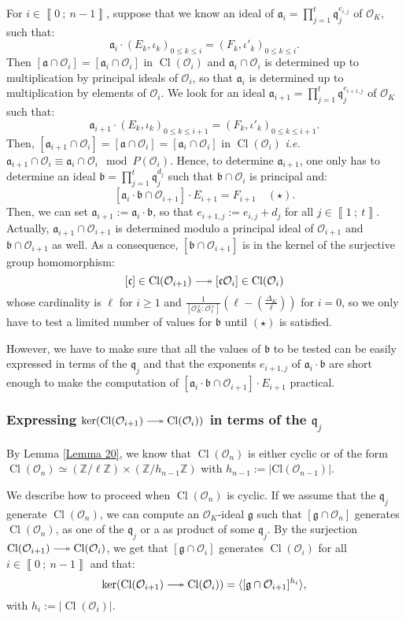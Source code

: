 \documentclass[a4paper,10pt]{report}
\theoremstyle{definition}
\theoremstyle{plain}
\theoremstyle{definition}
\newcommand{\ie}{\emph{i.e.}\ }
\newcommand{\Z}{\mathbb{Z}}
\newcommand{\mO}{\mathcal{O}}
\renewcommand{\i}[2]{\left\llbracket #1~;~#2\right\rrbracket}
\renewcommand{\(}{\left(}
\renewcommand{\)}{\right)}
\newcommand{\mf}[1]{\mathfrak{#1}}
\newcommand{\mfq}{\mathfrak{q}}
\DeclareMathOperator{\Cl}{Cl}
\begin{document}
For $i\in\i{0}{n-1}$, suppose that we know an ideal of $\mf{a}_i=\prod_{j=1}^t \mf{q}_j^{e_{i, j}}$ of $\mO_K$, such that: 
\[\mf{a}_i\cdot(E_k, \iota_k)_{0\leq k\leq i}=(F_k,\iota'_k)_{0\leq k\leq i}.\]
Then $[\mf{a}\cap \mO_i]=[\mf{a}_i\cap\mO_i]$ in $\Cl(\mO_i)$ and $\mf{a}_i\cap \mO_i$ is determined up to multiplication by principal ideals of $\mO_i$, so that $\mf{a}_i$ is determined up to multiplication by elements of $\mO_i$.  We look for an ideal $\mf{a}_{i+1}=\prod_{j=1}^t \mf{q}_j^{e_{i+1, j}}$ of $\mO_K$ such that:
\[\mf{a}_{i+1}\cdot(E_k, \iota_k)_{0\leq k\leq i+1}=(F_k,\iota'_k)_{0\leq k\leq i+1}.\]
Then, $[\mf{a}_{i+1}\cap\mO_{i}]=[\mf{a}\cap \mO_{i}]=[\mf{a}_i\cap\mO_{i}]$ in $\Cl(\mO_{i})$ \ie $\mf{a}_{i+1}\cap\mO_i\equiv \mf{a}_i\cap\mO_i \mod P(\mO_i)$. Hence, to determine $\mf{a}_{i+1}$, one only has to determine an ideal $\mf{b}=\prod_{j=1}^t\mf{q}_j^{d_j}$ such that $\mf{b}\cap\mO_i$ is principal and: 
\[[\mf{a}_i\cdot \mf{b}\cap\mO_{i+1}]\cdot E_{i+1}=F_{i+1} \quad (\star).\]
Then,  we can set $\mf{a}_{i+1}:=\mf{a}_i\cdot \mf{b}$, so that $e_{i+1,j}:=e_{i,j}+d_j$ for all $j\in\i{1}{t}$.  Actually, $\mf{a}_{i+1}\cap\mO_{i+1}$ is determined modulo a principal ideal of $\mO_{i+1}$ and $\mf{b}\cap\mO_{i+1}$ as well. As a consequence,  $[\mf{b}\cap\mO_{i+1}]$ is in the kernel of the surjective group homomorphism:
\[[\mf{c}]\in\Cl(\mO_{i+1})\relbar\joinrel\twoheadrightarrow [\mf{c}\mO_i]\in\Cl(\mO_{i})\]
whose cardinality is $\ell$ for $i\geq 1$ and $\frac{1}{[\mO_K^\times:\mO_1^\times]}\(\ell-\(\frac{\Delta_K}{\ell}\)\)$ for $i=0$, so we only have to test a limited number of values for $\mf{b}$ until $(\star)$ is satisfied.

However, we have to make sure that all the values of $\mf{b}$ to be tested can be easily expressed in terms of the $\mf{q}_j$ and that the exponents $e_{i+1,j}$ of $\mf{a}_i\cdot \mf{b}$ are short enough to make the computation of $[\mf{a}_i\cdot \mf{b}\cap\mO_{i+1}]\cdot E_{i+1}$ practical.  

\subsubsection{Expressing $\ker(\Cl(\mO_{i+1})\relbar\joinrel\twoheadrightarrow\Cl(\mO_{i}))$ in terms of the $\mfq_j$}

By Lemma \ref{Lemma 20}, we know that $\Cl(\mO_n)$ is either cyclic or of the form $\Cl(\mO_n)\simeq(\Z/\ell\Z)\times(\Z/h_{n-1}\Z)$ with $h_{n-1}:=|\mbox{Cl}(\mO_{n-1})|$.

We describe how to proceed when $\Cl(\mO_n)$ is cyclic. If we assume that the $\mf{q}_j$ generate $\Cl(\mO_n)$, we can compute an $\mO_K$-ideal $\mf{g}$ such that $[\mf{g}\cap\mO_n]$ generates $\Cl(\mO_n)$, as one of the $\mf{q}_j$ or a as product of some $\mf{q}_j$. By the surjection $\Cl(\mO_{i+1})\relbar\joinrel\twoheadrightarrow\Cl(\mO_i)$, we get that $[\mf{g}\cap\mO_i]$ generates $\Cl(\mO_i)$ for all $i\in\i{0}{n-1}$ and that:
\[\ker(\Cl(\mO_{i+1})\relbar\joinrel\twoheadrightarrow\Cl(\mO_{i}))=\langle [\mf{g}\cap\mO_{i+1}]^{h_i}\rangle,\]
with $h_i:=|\Cl(\mO_i)|$. 
\end{document}
